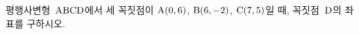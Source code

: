 평행사변형~$\mathrm{ABCD}$에서 세 꼭짓점이 $\mathrm{A}(0{,}\mkern3mu\mathopen{}6)$, $\mathrm{B}(6{,}\mkern3mu\mathopen{}-2)$, $\mathrm{C}(7{,}\mkern3mu\mathopen{}5)$일 때, 꼭짓점~$\mathrm{D}$의 좌표를 구하시오.
